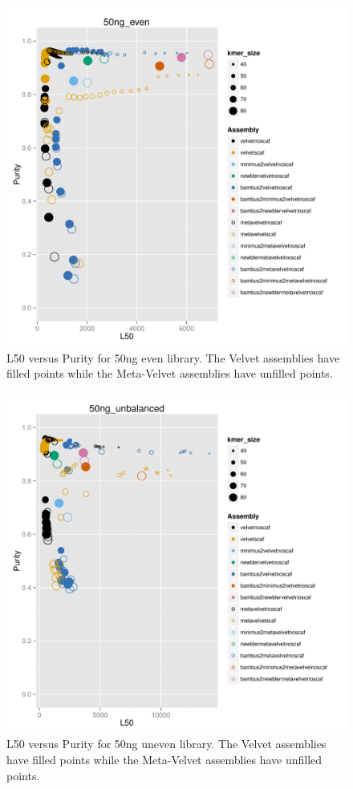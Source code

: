 \documentclass[a4paper,12pt]{report}
\begin{document}
\begin{figure}[ht!]
  \centering
    \includegraphics[width=\textwidth]{figures/l50-purity-50ng_even.pdf}
  \caption{L50 versus Purity for 50ng even library. The Velvet assemblies have filled points while the Meta-Velvet assemblies have unfilled points.}
  \label{fig:l50purity50ng_even}
\end{figure}
\begin{figure}[ht!]
  \centering
    \includegraphics[width=\textwidth]{figures/l50-purity-50ng_unbalanced.pdf}
  \caption{L50 versus Purity for 50ng uneven library. The Velvet assemblies have filled points while the Meta-Velvet assemblies have unfilled points.}
  \label{fig:l50purity50ng_uneven}
\end{figure}
\end{document}

